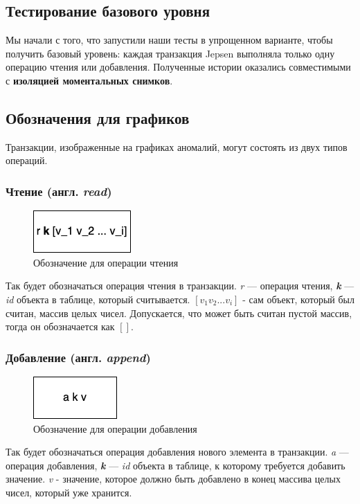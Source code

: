 \documentclass[12pt,  openany]{book}
\begin{document}
\subsection{Тестирование базового уровня}
Мы начали с того, что запустили наши тесты в упрощенном варианте, чтобы получить базовый уровень: каждая транзакция Jepsen выполняла только одну операцию чтения или добавления.
Полученные истории оказались совместимыми с \textbf{изоляцией моментальных снимков}.

\subsection{Обозначения для графиков}
Транзакции, изображенные на графиках аномалий, могут состоять из двух типов операций.
\subsubsection{Чтение (англ. \textit{read})}
\begin{figure}[H]
\centering
  \includegraphics[scale=1.0]{images/read.png}
  \caption{Обозначение для операции чтения}
\end{figure}
Так будет обозначаться операция чтения в транзакции. \textit{r} --- операция чтения, \textit{\textbf{k}} --- \textit{id} объекта в таблице, который считывается. $[v_1 v_2 ... v_i]$ - сам объект, который был считан, массив целых чисел. Допускается, что может быть считан пустой массив, тогда он обозначается как $[]$.

\subsubsection{Добавление (англ. \textit{append})}
\begin{figure}[H]
\centering
  \includegraphics[scale=1.0]{images/append.png}
  \caption{Обозначение для операции добавления}
\end{figure}
Так будет обозначаться операция добавления нового элемента в транзакции. \textit{a} --- операция добавления, \textit{\textbf{k}} --- \textit{id} объекта в таблице,  к которому требуется добавить значение. \textit{v} - значение, которое должно быть добавлено в конец массива целых чисел, который уже хранится.
\end{document}
